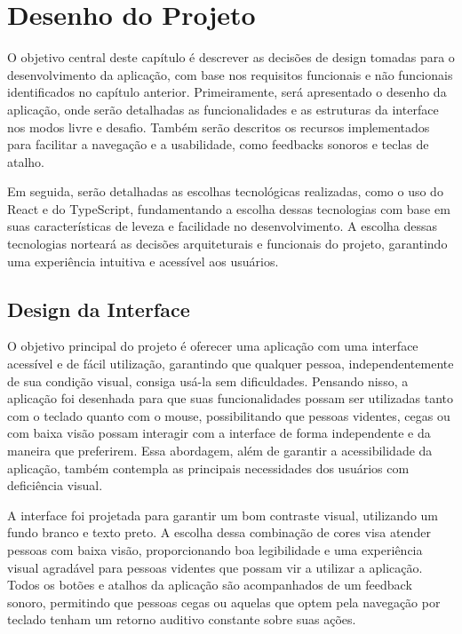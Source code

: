 \chapter{Desenho do Projeto} 
\label{chap:Chapter06}

O objetivo central deste capítulo é descrever as decisões de design tomadas para o desenvolvimento da aplicação, com base nos requisitos funcionais e não funcionais identificados no capítulo anterior. Primeiramente, será apresentado o desenho da aplicação, onde serão detalhadas as funcionalidades e as estruturas da interface nos modos livre e desafio. Também serão descritos os recursos implementados para facilitar a navegação e a usabilidade, como feedbacks sonoros e teclas de atalho.

Em seguida, serão detalhadas as escolhas tecnológicas realizadas, como o uso do React e do TypeScript, fundamentando a escolha dessas tecnologias com base em suas características de leveza e facilidade no desenvolvimento. A escolha dessas tecnologias norteará as decisões arquiteturais e funcionais do projeto, garantindo uma experiência intuitiva e acessível aos usuários.

\section{Design da Interface}

O objetivo principal do projeto é oferecer uma aplicação com uma interface acessível e de fácil utilização, garantindo que qualquer pessoa, independentemente de sua condição visual, consiga usá-la sem dificuldades. Pensando nisso, a aplicação foi desenhada para que suas funcionalidades possam ser utilizadas tanto com o teclado quanto com o mouse, possibilitando que pessoas videntes, cegas ou com baixa visão possam interagir com a interface de forma independente e da maneira que preferirem. Essa abordagem, além de garantir a acessibilidade da aplicação, também contempla as principais necessidades dos usuários com deficiência visual.

A interface foi projetada para garantir um bom contraste visual, utilizando um fundo branco e texto preto. A escolha dessa combinação de cores visa atender pessoas com baixa visão, proporcionando boa legibilidade e uma experiência visual agradável para pessoas videntes que possam vir a utilizar a aplicação. Todos os botões e atalhos da aplicação são acompanhados de um feedback sonoro, permitindo que pessoas cegas ou aquelas que optem pela navegação por teclado tenham um retorno auditivo constante sobre suas ações.

